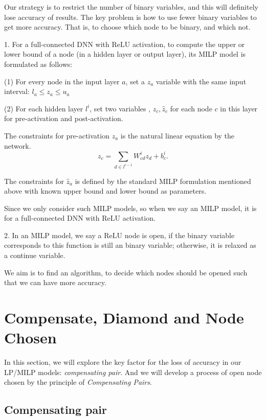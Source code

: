 \documentclass{llncs}
\newcommand{\ReLU}{\mathrm{ReLU}}
\begin{document}
Our strategy is to restrict the number of binary variables, and this will definitely lose accuracy of results.  The key problem is how to use fewer binary variables to get more accuracy. That is, to choose which node to be binary, and which not.

\begin{definition}
	1. For a full-connected DNN with $\ReLU$ activation, to compute the upper or lower bound of a node (in a hidden layer or output layer), its MILP model is formulated as follows: 
	
	(1) For every node in the input layer $a$, set a $z_a$ variable with the same input interval: $l_a\leq z_a\leq u_a$
	
	(2) For each hidden layer $l^i$, set two variables , $z_c,\hat{z}_c$ for each node $c$ in this layer for pre-activation and post-activation. 
	
	The constraints for pre-activation $z_a$ is the natural linear equation by the network. 	$$z_c=\sum_{d\in l^{i-1}} W^i_{cd} z_d+b^i_c.$$
	
	
	The constraints for $\hat{z}_a$ is defined by the standard MILP formulation mentioned above with known upper bound and lower bound as parameters.
	
	\vspace*{1ex}
	
	Since we only consider such MILP models, so when we say an MILP model, it is for a full-connected DNN with $\ReLU$ activation. 
	
	2. In an MILP model, we say a $\ReLU$ node is open, if the binary variable corresponds to this function is still an binary variable; otherwise, it is relaxed as a continue variable. 
\end{definition}

We aim is to find an algorithm, to decide which nodes should be opened such that we can have more accuracy.

\section{Compensate, Diamond and Node Chosen}

In this section, we will explore the key factor for the loss of accuracy in our LP/MILP models: \emph{compensating pair}. And we will develop a process of open node chosen by the principle of \emph{Compensating Pairs}. 



\subsection{Compensating pair}
\end{document}
